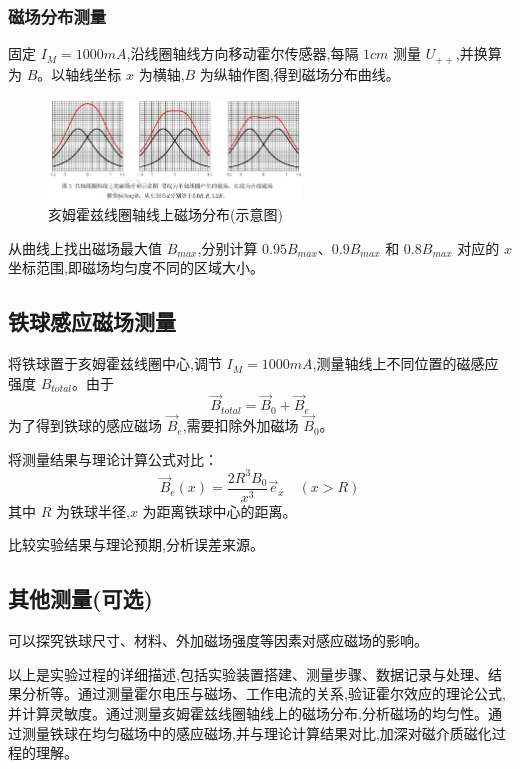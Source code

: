 \documentclass[UTF8]{ctexart}
\begin{document}
    \subsubsection{磁场分布测量}
    固定 $I_M=1000mA$,沿线圈轴线方向移动霍尔传感器,每隔 $1cm$ 测量 $U_{++}$,并换算为 $B$。以轴线坐标 $x$ 为横轴,$B$ 为纵轴作图,得到磁场分布曲线。
    
    \begin{figure}[htbp]
    \centering
    \includegraphics[width=0.6\textwidth]{B-x.png}
    \caption{亥姆霍兹线圈轴线上磁场分布(示意图)}
    \label{fig:B-x}
    \end{figure}
\newpage
    从曲线上找出磁场最大值 $B_{max}$,分别计算 $0.95B_{max}$、$0.9B_{max}$ 和 $0.8B_{max}$ 对应的 $x$ 坐标范围,即磁场均匀度不同的区域大小。
    
    \subsection{铁球感应磁场测量}
    将铁球置于亥姆霍兹线圈中心,调节 $I_M=1000mA$,测量轴线上不同位置的磁感应强度 $B_{total}$。由于
    \begin{equation}
    \vec{B}_{total} = \vec{B}_0 + \vec{B}_e     
    \end{equation}
    为了得到铁球的感应磁场 $\vec{B}_e$,需要扣除外加磁场 $\vec{B}_0$。
    
    将测量结果与理论计算公式对比：
    \begin{equation}
    \vec{B}_e(x) = \frac{2R^3 B_0}{x^3}\vec{e}_x \quad (x > R)
    \end{equation}
    其中 $R$ 为铁球半径,$x$ 为距离铁球中心的距离。
    
    
    比较实验结果与理论预期,分析误差来源。
    
    \subsection{其他测量(可选)}
    可以探究铁球尺寸、材料、外加磁场强度等因素对感应磁场的影响。
    
    以上是实验过程的详细描述,包括实验装置搭建、测量步骤、数据记录与处理、结果分析等。通过测量霍尔电压与磁场、工作电流的关系,验证霍尔效应的理论公式,并计算灵敏度。通过测量亥姆霍兹线圈轴线上的磁场分布,分析磁场的均匀性。通过测量铁球在均匀磁场中的感应磁场,并与理论计算结果对比,加深对磁介质磁化过程的理解。
    
\end{document}
